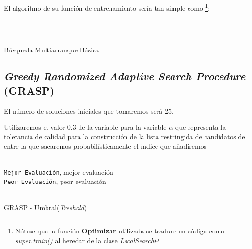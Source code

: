 \documentclass[a4paper, 11pt]{article}
\begin{document}
			El algoritmo de su función de entrenamiento sería tan simple como \footnote{Nótese que la
			función \textbf{Optimizar} utilizada se traduce en código como \textit{super.train()} al
			heredar de la clase \textit{LocalSearch}}:
			
			\begin{algorithm}[H]
				\begin{algorithmic}[1]
				\REQUIRE \ \\
						 \
					\ENDIF
				\ENDFOR
			\end{algorithmic}
		\caption{Búsqueda Multiarranque Básica}
		\label{BMBS}
		\end{algorithm}

		\subsection{\textit{Greedy Randomized Adaptive Search Procedure} (\textbf{GRASP})}
			El número de soluciones iniciales que tomaremos será 25.
			
			Utilizaremos el valor $0.3$ de la variable para la variable $\alpha$ que representa la
			tolerancia de calidad para la construcción de la lista restringida de candidatos de entre
			la que sacaremos probabilísticamente el índice que añadiremos
			\begin{algorithm}[H]
				\begin{algorithmic}[1]
					\REQUIRE \ \\
						\texttt{Mejor\_Evaluación}, mejor evaluación \\
						\texttt{Peor\_Evaluación}, peor evaluación \\ \
						
				\end{algorithmic}
			\caption{GRASP - Umbral(\textit{Treshold})}
			\label{Treshold}
			\end{algorithm}
			
\end{document}
